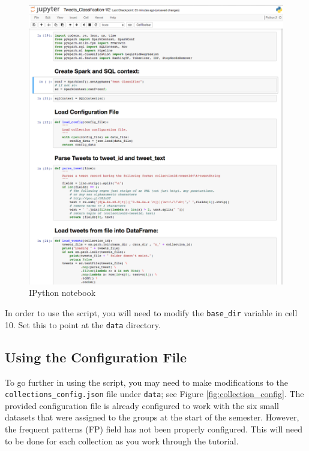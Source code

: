 \begin{figure}[th!]
	\centering
	\includegraphics[width=\textwidth]{figures/IPython_Tweet_Classification}
    \caption{IPython notebook}\label{fig:ipy_notebook}
\end{figure}

In order to use the script, you will need to modify the \texttt{base\_dir} variable in cell 10. Set this to point at the \texttt{data} directory.

\subsection{Using the Configuration File}

To go further in using the script, you may need to make modifications to the \texttt{collections\_config.json} file under \texttt{data}; see Figure \ref{fig:collection_config}. The provided configuration file is already configured to work with the six small datasets that were assigned to the groups at the start of the semester. However, the frequent patterns (FP) field has not been properly configured. This will need to be done for each collection as you work through the tutorial.


